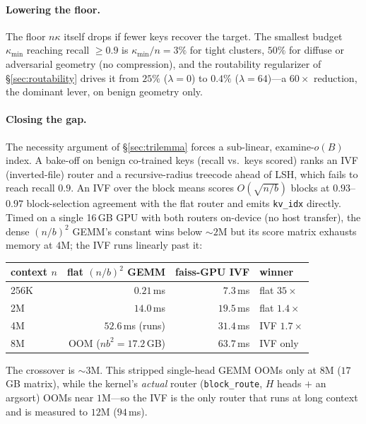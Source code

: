 \documentclass[11pt]{article}
\numberwithin{equation}{section}
\begin{document}
\paragraph{Lowering the floor.} The floor $n\kappa$ itself drops if fewer keys recover the target. The smallest
budget $\kappa_{\min}$ reaching recall $\ge 0.9$ is $\kappa_{\min}/n=3\%$ for tight clusters, $50\%$ for diffuse
or adversarial geometry (no compression), and the routability regularizer of \S\ref{sec:routability} drives it
from $25\%$ ($\lambda=0$) to $\mathbf{0.4\%}$ ($\lambda=64$)---a $60\times$ reduction, the dominant lever, on
benign geometry only.

\paragraph{Closing the gap.} The necessity argument of \S\ref{sec:trilemma} forces a sub-linear, examine-$o(B)$
index. A bake-off on benign co-trained keys (recall vs.\ keys scored) ranks an IVF (inverted-file) router and a
recursive-radius treecode ahead of LSH, which fails to reach recall $0.9$. An IVF over the block means scores
$O(\sqrt{n/b})$ blocks at $0.93$--$0.97$ block-selection agreement with the flat router and emits
\texttt{kv\_idx} directly. Timed on a single 16\,GB GPU with both routers on-device (no host transfer), the
dense $(n/b)^2$ GEMM's constant wins below ${\sim}2\mathrm{M}$ but its score matrix exhausts memory at
$4\mathrm{M}$; the IVF runs linearly past it:

\begin{center}\small
\begin{tabular}{lrrl}
\hline
context $n$ & flat $(n/b)^2$ GEMM & faiss-GPU IVF & winner\\
\hline
256K & $0.21$\,ms & $7.3$\,ms & flat $35\times$\\
2M & $14.0$\,ms & $19.5$\,ms & flat $1.4\times$\\
4M & $52.6$\,ms (runs) & $31.4$\,ms & IVF $1.7\times$\\
8M & OOM ($nb^2{=}17.2$\,GB) & $63.7$\,ms & IVF only\\
\hline
\end{tabular}
\end{center}

\noindent The crossover is ${\sim}3\mathrm{M}$. This stripped single-head GEMM OOMs only at $8\mathrm{M}$
($17$\,GB matrix), while the kernel's \emph{actual} router (\texttt{block\_route}, $H$ heads $+$ an argsort)
OOMs near $1\mathrm{M}$---so the IVF is the only router that runs at long context and is measured to
$12\mathrm{M}$ ($94$\,ms).
\end{document}

